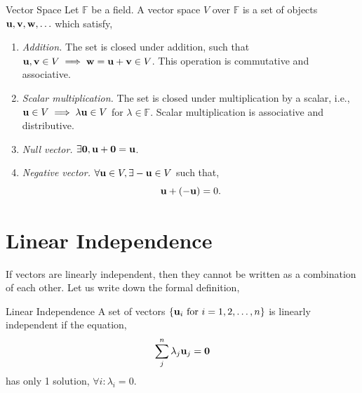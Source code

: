 \documentclass{book}
\begin{document}
\begin{Definitions}{Vector Space}{}
	Let $\mathbb{F}$ be a field. A vector space $V$ over $\mathbb{F}$ is a set of objects $\vb{u}, \vb{v}, \vb{w},\ldots$ which satisfy,
	\begin{enumerate}
		\item \textit{Addition.} The set is closed under addition, such that $\vb{u}, \vb{v} \in V \implies \vb{w} = \vb{u} + \vb{v} \in V$. This operation is commutative and associative.
		\item \textit{Scalar multiplication.} The set is closed under multiplication by a scalar, i.e., $\vb{u} \in V \implies \lambda \vb{u}\in V$ for $\lambda \in \mathbb{F}$. Scalar multiplication is associative and distributive.
		\item \textit{Null vector.} $\exists \vb{0}, \vb{u} + \vb{0} = \vb{u}$.
		\item \textit{Negative vector.} $\forall \vb{u} \in V, \exists -\vb{u} \in V$ such that,
		\begin{equation}
			\vb{u} + (-\vb{u}) = 0.
		\end{equation} 
	\end{enumerate}
\end{Definitions}
\section{Linear Independence}
If vectors are linearly independent, then they cannot be written as a combination of each other. Let us write down the formal definition,
\begin{Definitions}{Linear Independence}{}
	A set of vectors $\left\{\vb{u}_i \text{ for } i = 1, 2, \ldots, n\right\}$ is linearly independent if the equation,
	\begin{equation}
		\sum_j^n \lambda_j\vb{u}_j = \vb{0}
	\end{equation}
	has only 1 solution, $\forall i : \lambda_i = 0$.
\end{Definitions}
\end{document}
